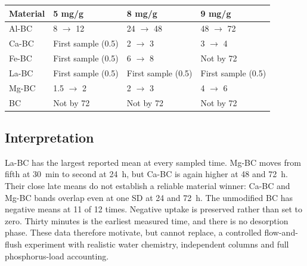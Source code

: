 \documentclass[11pt,letterpaper]{article}
\begin{document}
\begin{center}\begin{minipage}{\textwidth}\centering\small
{}
\begin{tabular}{@{}llll@{}}\toprule
Material & 5 mg/g & 8 mg/g & 9 mg/g\\\midrule
Al-BC & 8 $\to$ 12 & 24 $\to$ 48 & 48 $\to$ 72 \\
Ca-BC & First sample (0.5) & 2 $\to$ 3 & 3 $\to$ 4 \\
Fe-BC & First sample (0.5) & 6 $\to$ 8 & Not by 72 \\
La-BC & First sample (0.5) & First sample (0.5) & First sample (0.5) \\
Mg-BC & 1.5 $\to$ 2 & 2 $\to$ 3 & 4 $\to$ 6 \\
BC & Not by 72 & Not by 72 & Not by 72 \\
\bottomrule\end{tabular}
\end{minipage}\end{center}

\subsection{Interpretation}
La-BC has the largest reported mean at every sampled time. Mg-BC moves from fifth at 30~min to second at 24~h, but Ca-BC is again higher at 48 and 72~h. Their close late means do not establish a reliable material winner: Ca-BC and Mg-BC bands overlap even at one SD at 24 and 72~h. The unmodified BC has negative means at 11 of 12 times. Negative uptake is preserved rather than set to zero. Thirty minutes is the earliest measured time, and there is no desorption phase. These data therefore motivate, but cannot replace, a controlled flow-and-flush experiment with realistic water chemistry, independent columns and full phosphorus-load accounting.
\end{document}
